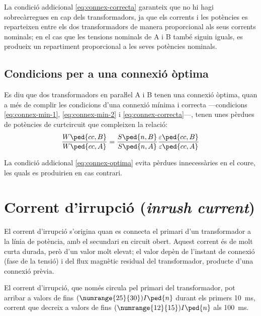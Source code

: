 La condició addicional  \eqref{eq:connex-correcta} garanteix que no hi hagi sobrecàrregues en cap dels transformadors, ja que els corrents i les potències es reparteixen entre els dos transformadors de manera proporcional als seus corrents nominals; en el cas que les tensions nominals de A i B també siguin  iguals, es produeix un repartiment proporcional a les seves potències nominals.


\subsection{Condicions per a una connexió òptima}\label{sec:connex-optima}

 Es diu que dos transformadors en paraŀlel A i B tenen una connexió òptima, quan a més de complir les condicions d'una connexió mínima i correcta ---condicions \eqref{eq:connex-min-1}, \eqref{eq:connex-min-2} i \eqref{eq:connex-correcta}---, tenen unes pèrdues de potències de curtcircuit que compleixen la relació:
\begin{equation}
    \frac{W\ped{cc,B}}{W\ped{cc,A}} = \frac{S\ped{n,B}}{S\ped{n,A}} \frac{\varepsilon\ped{cc,B}}{\varepsilon\ped{cc,A}} \label{eq:connex-optima}
\end{equation}

La condició addicional \eqref{eq:connex-optima} evita pèrdues innecessàries en el coure, les quals es produirien en cas contrari.


\section{Corrent d'irrupció (\textit{inrush current})}

El corrent d'irrupció s'origina quan es  connecta el primari d'un transformador a la línia de potència, amb el secundari en circuit obert. Aquest corrent és de molt curta durada, però d'un valor molt elevat; el valor depèn de l'instant de connexió (fase de la tensió) i del flux magnètic residual del transformador, producte d'una connexió prèvia.

El corrent d'irrupció, que només circula pel primari del transformador, pot arribar a valors de fins $(\numrange{25}{30}) I\ped{n}$ durant els primers \qty{10}{ms}, corrent que decreix a valors de fins   $(\numrange{12}{15}) I\ped{n}$ als \qty{100}{ms}.

